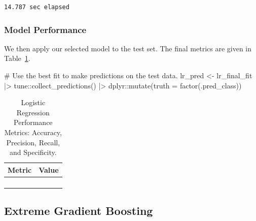 \documentclass[
  letterpaper,
  DIV=11,
  numbers=noendperiod]{scrartcl}
\newenvironment{Shaded}{\begin{snugshade}}{\end{snugshade}}
\newcommand{\AttributeTok}[1]{\textcolor[rgb]{0.40,0.45,0.13}{#1}}
\newcommand{\CommentTok}[1]{\textcolor[rgb]{0.37,0.37,0.37}{#1}}
\newcommand{\FunctionTok}[1]{\textcolor[rgb]{0.28,0.35,0.67}{#1}}
\newcommand{\NormalTok}[1]{\textcolor[rgb]{0.00,0.23,0.31}{#1}}
\newcommand{\OtherTok}[1]{\textcolor[rgb]{0.00,0.23,0.31}{#1}}
\newcommand{\SpecialCharTok}[1]{\textcolor[rgb]{0.37,0.37,0.37}{#1}}
\begin{document}
\begin{verbatim}
14.787 sec elapsed
\end{verbatim}

\subsubsection{Model Performance}\label{model-performance-3}

We then apply our selected model to the test set. The final metrics are
given in Table~\ref{tbl-lr-performance-pdf}.

\begin{Shaded}
\begin{Highlighting}[]
\CommentTok{\# Use the best fit to make predictions on the test data.}
\NormalTok{lr\_pred }\OtherTok{\textless{}{-}} 
\NormalTok{  lr\_final\_fit }\SpecialCharTok{|\textgreater{}} 
\NormalTok{  tune}\SpecialCharTok{::}\FunctionTok{collect\_predictions}\NormalTok{() }\SpecialCharTok{|\textgreater{}}
\NormalTok{  dplyr}\SpecialCharTok{::}\FunctionTok{mutate}\NormalTok{(}\AttributeTok{truth =} \FunctionTok{factor}\NormalTok{(.pred\_class))}
\end{Highlighting}
\end{Shaded}

\begin{longtable}{>{\raggedright\arraybackslash}p{}>{\raggedleft\arraybackslash}p{}}

\caption{\label{tbl-lr-performance-pdf}Logistic Regression Performance
Metrics: Accuracy, Precision, Recall, and Specificity.}

\tabularnewline

\toprule
Metric & Value \\ 
\midrule\addlinespace[2.5pt]
\cellcolor[HTML]{FFFFFF}{Accuracy} & \cellcolor[HTML]{FFFFFF}{93.4} \\ 
\cellcolor[HTML]{FFFFFF}{Precision} & \cellcolor[HTML]{FFFFFF}{84.6} \\ 
\cellcolor[HTML]{FFFFFF}{Recall} & \cellcolor[HTML]{FFFFFF}{91.7} \\ 
\cellcolor[HTML]{FFFFFF}{Specificity} & \cellcolor[HTML]{FFFFFF}{94.0} \\ 
\bottomrule

\end{longtable}

\subsection{Extreme Gradient Boosting}\label{extreme-gradient-boosting}
\end{document}

